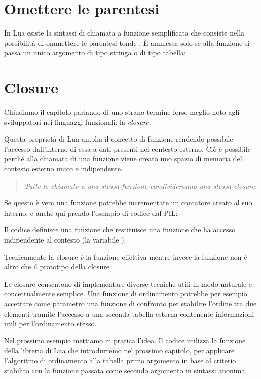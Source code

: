 \section{Omettere le parentesi}

In Lua esiste la sintassi di chiamata a funzione semplificata che consiste nella
possibilità di ommettere le parentesi tonde \key{()}. È ammessa solo se alla
funzione si passa un unico argomento di tipo stringa o di tipo tabella:


\section{Closure}
\label{secClosure}

Chiudiamo il capitolo parlando di uno strano termine forse meglio noto agli
sviluppatori nei linguaggi funzionali: la \emph{closure}.

Questa proprietà di Lua amplia il concetto di funzione rendendo possibile
l'accesso dall'interno di essa a dati presenti nel contesto esterno. Ciò è
possibile perché alla chiamata di una funzione viene creato uno spazio di
memoria del contesto esterno unico e indipendente.

\begin{quote}
\emph{%
Tutte le chiamate a una stessa funzione condivideranno una stessa closure.%
}
\end{quote}

Se questo è vero una funzione potrebbe incrementare un contatore creato al suo
interno, e anche qui prendo l'esempio di codice dal PIL:

Il codice definisce una funzione  che restituisce una
funzione che ha accesso indipendente al contesto (la variabile ).

Tecnicamente la closure \emph{è} la funzione effettiva mentre invece la
funzione non è altro che il prototipo della closure.

Le closure consentono di implementare diverse tecniche utili in modo naturale e
concettualmente semplice. Una funzione di ordinamento potrebbe per esempio
accettare come parametro una funzione di confronto per stabilire l'ordine tra
due elementi tramite l'accesso a una seconda tabella esterna contenente
informazioni utili per l'ordinamento stesso.

Nel prossimo esempio mettiamo in pratica l'idea. Il codice utilizza la funzione
 della libreria di Lua che introdurremo nel prossimo capitolo,
per applicare l'algoritmo di ordinamento alla tabella primo argomento in
base al criterio stabilito con la funzione passata come secondo
argomento in sintassi anonima.


